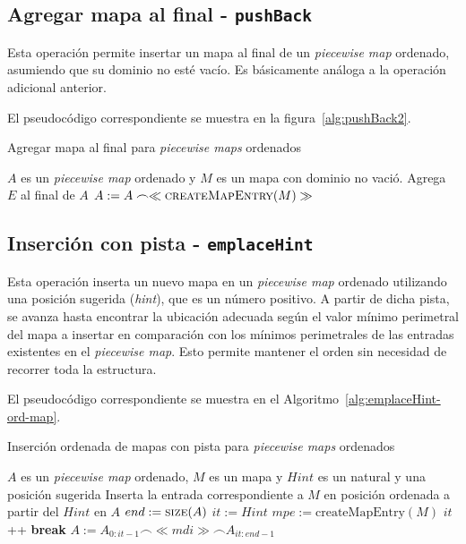 \subsection{Agregar mapa al final - \texttt{pushBack}}

Esta operación permite insertar un mapa al final de un \textit{piecewise map} ordenado, asumiendo que su dominio no esté vacío. Es básicamente análoga a la operación adicional anterior.

El pseudocódigo correspondiente se muestra en la figura~\ref{alg:pushBack2}.

\begin{algorithm}
\caption{Agregar mapa al final para \textit{piecewise maps} ordenados}
\label{alg:pushBack2}
\begin{algorithmic}[1]
\Require $A$ es un \textit{piecewise map} ordenado y $M$ es un mapa con dominio no vació.
\Ensure Agrega $E$ al final de $A$
    \State $A := A \frown \ll \Call{createMapEntry}{M} \gg$
\EndFunction
\end{algorithmic}
\end{algorithm}

\subsection{Inserción con pista - \texttt{emplaceHint}}

Esta operación inserta un nuevo mapa en un \textit{piecewise map} ordenado utilizando una posición sugerida (\textit{hint}), que es un número positivo. A partir de dicha pista, se avanza hasta encontrar la ubicación adecuada según el valor mínimo perimetral del mapa a insertar en comparación con los mínimos perimetrales de las entradas existentes en el \textit{piecewise map}. Esto permite mantener el orden sin necesidad de recorrer toda la estructura.

El pseudocódigo correspondiente se muestra en el Algoritmo~\ref{alg:emplaceHint-ord-map}.

\begin{algorithm}
\caption{Inserción ordenada de mapas con pista para \textit{piecewise maps} ordenados}
\label{alg:emplaceHint-ord-map}
\begin{algorithmic}[1]
\Require $A$ es un \textit{piecewise map} ordenado, $M$ es un mapa y $Hint$ es un natural y una posición sugerida
\Ensure Inserta la entrada correspondiente a $M$ en posición ordenada a partir del $Hint$ en $A$
  \State $end := \Call{size}{A}$ 
  \State $it := Hint$ 
  \State $mpe := \mathrm{createMapEntry}(M)$
      \State $it$ \!+\!+
    \Else
      \State \textbf{break}
    \EndIf
  \EndWhile
  \State $A:= A_{0:it-1} \frown \ll mdi\gg \frown A_{it:end-1}$
\EndFunction
\end{algorithmic}
\end{algorithm}


